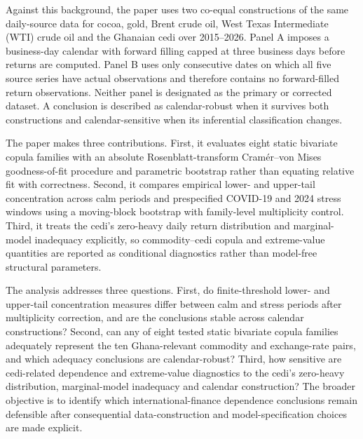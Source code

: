 Against this background, the paper uses two co-equal constructions of the same daily-source data for cocoa, gold, Brent crude oil, West Texas Intermediate (WTI) crude oil and the Ghanaian cedi over 2015--2026. Panel A imposes a business-day calendar with forward filling capped at three business days before returns are computed. Panel B uses only consecutive dates on which all five source series have actual observations and therefore contains no forward-filled return observations. Neither panel is designated as the primary or corrected dataset. A conclusion is described as calendar-robust when it survives both constructions and calendar-sensitive when its inferential classification changes.

The paper makes three contributions. First, it evaluates eight static bivariate copula families with an absolute Rosenblatt-transform Cram\'{e}r--von Mises goodness-of-fit procedure and parametric bootstrap rather than equating relative fit with correctness. Second, it compares empirical lower- and upper-tail concentration across calm periods and prespecified COVID-19 and 2024 stress windows using a moving-block bootstrap with family-level multiplicity control. Third, it treats the cedi's zero-heavy daily return distribution and marginal-model inadequacy explicitly, so commodity--cedi copula and extreme-value quantities are reported as conditional diagnostics rather than model-free structural parameters.

The analysis addresses three questions. First, do finite-threshold lower- and upper-tail concentration measures differ between calm and stress periods after multiplicity correction, and are the conclusions stable across calendar constructions? Second, can any of eight tested static bivariate copula families adequately represent the ten Ghana-relevant commodity and exchange-rate pairs, and which adequacy conclusions are calendar-robust? Third, how sensitive are cedi-related dependence and extreme-value diagnostics to the cedi's zero-heavy distribution, marginal-model inadequacy and calendar construction? The broader objective is to identify which international-finance dependence conclusions remain defensible after consequential data-construction and model-specification choices are made explicit.
